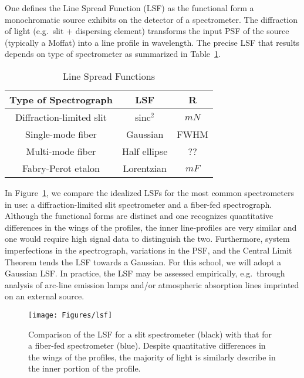 \documentclass[graybox]{svmult}
\begin{document}
One defines the Line Spread Function (LSF)
as the functional form a monochromatic source exhibits 
on the detector of a spectrometer.
The diffraction of light (e.g.\ slit + dispersing element)
transforms the input PSF of the source (typically a Moffat) into a line 
profile in wavelength.  The precise 
LSF that results depends on type of spectrometer 
\cite[e.g.][]{robertson13} as summarized in Table~\ref{tab:LSF}.

\begin{table}[ht]
\begin{center}
\caption{{\sc Line Spread Functions}}
\label{tab:LSF}
\vskip 0.05in
\begin{tabular}{ccc}
\hline
Type of Spectrograph & LSF & R \\
\hline
Diffraction-limited slit & sinc$^2$     & $mN$ \\
Single-mode fiber        & Gaussian     & FWHM \\
Multi-mode fiber         & Half ellipse & ??\\ 
Fabry-Perot etalon       & Lorentzian   & $mF$ \\
\hline
\end{tabular}
\end{center}
\end{table}

In Figure~\ref{fig:LSF}, we compare the idealized LSFs for the
most common spectrometers in use: a diffraction-limited slit 
spectrometer and a fiber-fed spectrograph.
Although the functional forms are distinct and one recognizes
quantitative differences in the wings of the profiles,
the inner line-profiles are very similar and one would
require high signal data to distinguish the two.
Furthermore, system imperfections in the spectrograph, variations
in the PSF, and the Central Limit Theorem tends the LSF 
towards a Gaussian. For this school, we will adopt a Gaussian LSF.
In practice, the LSF may be assessed empirically, e.g.\ through
analysis of arc-line emission lamps and/or 
atmospheric absorption lines imprinted on an external source.


%
\begin{figure}[b]
\sidecaption
\texttt{[image: Figures/lsf]}
%
%
\caption{Comparison of the LSF for a slit spectrometer (black) with
that for a fiber-fed spectrometer (blue).  Despite quantitative 
differences in the wings of the profiles, the majority of light is
similarly describe in the inner portion of the profile.
}
\label{fig:LSF}       %
\end{figure}
\end{document}
